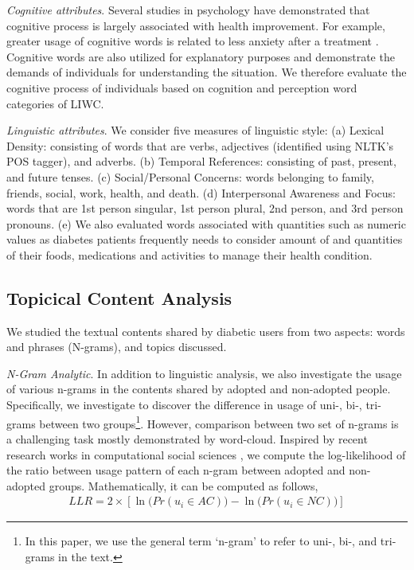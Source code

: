 \documentclass{acm_proc_article-sp}
\begin{document}
\emph{Cognitive attributes}. Several studies in psychology have demonstrated that cognitive process is largely associated with health improvement. For example, greater usage of cognitive words is related to less anxiety after a treatment \cite{alvarez2001linguistic}. Cognitive words are also utilized for explanatory purposes and demonstrate the demands of individuals for understanding the situation. We therefore evaluate the cognitive process of individuals based on cognition and perception word categories of LIWC.

\emph{Linguistic attributes}. We consider five measures of linguistic style: (a) Lexical Density: consisting of words that are verbs, adjectives (identified using NLTK's POS tagger), and  adverbs. (b) Temporal References: consisting of past, present, and future tenses. (c) Social/Personal Concerns: words belonging to family, friends, social, work, health, and death. (d) Interpersonal Awareness and Focus: words that are 1st person singular, 1st person plural, 2nd person, and 3rd person pronouns. (e) We also evaluated words associated with quantities such as numeric values as diabetes patients frequently needs to consider amount of  and quantities of their foods, medications and activities to manage their health condition.




\subsection{Topicical Content Analysis}
\label{sec::topic-content-anal}
We studied the textual contents shared by diabetic users from two aspects: words and phrases (N-grams), and topics discussed.

\emph{N-Gram Analytic}. In addition to linguistic analysis, we also investigate the usage of various n-grams in the contents shared by adopted and non-adopted people. Specifically, we investigate to discover the difference in usage of uni-, bi-, tri-grams between two groups\footnote{In this paper, we use the general term `n-gram' to refer to uni-, bi-, and tri-grams in the text.}. However, comparison between two set of n-grams is a challenging task mostly demonstrated by word-cloud. Inspired by recent research works in computational social sciences \cite{kumar2015detecting}, we compute the log-likelihood of the ratio between usage pattern of each n-gram between adopted and non-adopted groups. Mathematically, it can be computed as follows,
\begin{align}
LLR =  2 \times [\ln \big (Pr(u_i \in AC)\big ) - \ln \big(Pr(u_i \in NC)\big)]
\end{align}
\end{document}

